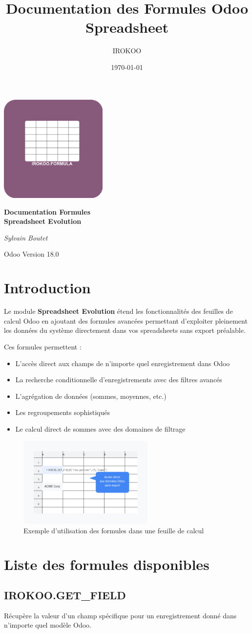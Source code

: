 \documentclass[12pt, a4paper]{article}
\title{Documentation des Formules Odoo Spreadsheet}
\author{IROKOO}
\date{\today}
\makeatletter
\def\maketitle{
    \begin{titlepage}
        \centering
        \vspace*{2cm}
        
        \includegraphics[width=0.4\textwidth]{../icon.png}
        \vspace{2cm}
        
        {\huge\bfseries Documentation Formules\\Spreadsheet Evolution\par}
        \vspace{2cm}
        
        {\Large\itshape Sylvain Boutet\par}
        \vspace{1cm}
        
        {\large \@date\par}
        
        \vfill
        
        {\large Odoo Version 18.0\par}
    \end{titlepage}
}
\makeatother
\begin{document}
\maketitle
\tableofcontents
\newpage

\section{Introduction}

Le module \textbf{Spreadsheet Evolution} étend les fonctionnalités des feuilles de calcul Odoo en ajoutant des formules avancées permettant d'exploiter pleinement les données du système directement dans vos spreadsheets sans export préalable.

Ces formules permettent :
\begin{itemize}
    \item L'accès direct aux champs de n'importe quel enregistrement dans Odoo
    \item La recherche conditionnelle d'enregistrements avec des filtres avancés
    \item L'agrégation de données (sommes, moyennes, etc.)
    \item Les regroupements sophistiqués
    \item Le calcul direct de sommes avec des domaines de filtrage
\end{itemize}

\begin{figure}[H]
    \centering
    \includegraphics[width=0.6\textwidth]{feature1.png}
    \caption{Exemple d'utilisation des formules dans une feuille de calcul}
\end{figure}

\section{Liste des formules disponibles}

\subsection{IROKOO.GET\_FIELD}
\begin{tcolorbox}[title=Description]
Récupère la valeur d'un champ spécifique pour un enregistrement donné dans n'importe quel modèle Odoo.
\end{tcolorbox}
\end{document}
